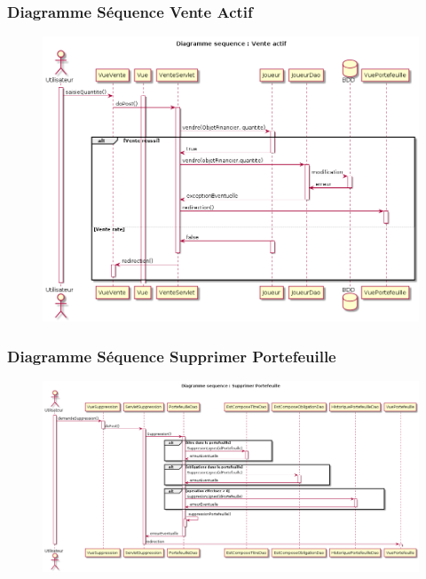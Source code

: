 \begin{frame}
    \frametitle{Diagramme Séquence Vente Actif}
    \begin{figure}
		\includegraphics[scale=0.23]{images/DiagrammeSequenceVenteActif.png}
	\end{figure}

\end{frame}

\begin{frame}
    \frametitle{Diagramme Séquence Supprimer Portefeuille}
    \begin{figure}
		\includegraphics[scale=0.22]{images/DiagrammeSequenceSupprimerPortefeuille.png}
	\end{figure}

\end{frame}